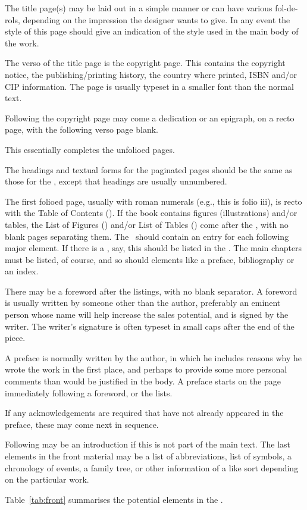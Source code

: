 \documentclass[10pt,a4paper,extrafontsizes]{memoir}
\begin{document}
\begin{paracol}{2}
    The title page(s) may be laid out in a simple manner or can have various
fol-de-rols, depending on the impression the designer wants to give. In
any event the style of this page should give an indication of the style
used in the main body of the work.

    The verso of the title page is the copyright page.
This contains the copyright notice, the publishing/printing history, 
the country where printed, ISBN and/or CIP information. The page is usually 
typeset in a smaller font than the normal text.

    Following the copyright page may come a dedication or an epigraph, 
on a recto page, with the following verso page blank.

    This essentially completes the unfolioed pages.

    The headings and textual forms for the paginated 
pages should be the same as those for the \pixmainmatter, except that 
headings are usually unnumbered.

    The first folioed page,
usually with roman numerals (e.g., this is folio iii),
is recto with the Table of Contents (\toc). If the book contains 
figures (illustrations) 
and/or tables, the List of Figures (\lof) and/or List of Tables 
(\lot) come after the \toc, with no blank pages separating them. The \toc\ 
should contain an entry for each following major element. If there is a \lot, 
say, this should be listed in the \toc. The main chapters\index{chapter} must 
be listed, of course, and so should elements like a preface\index{preface}, 
bibliography\index{bibliography} or an index\index{index}.

    There may be a foreword after the listings, with no blank
separator. A foreword is usually written by someone other than the author, 
preferably an eminent person whose name will help increase the sales potential,
and is signed by the writer. The writer's
signature is often typeset in small caps after the end of the piece.

   A preface is normally written by the author, in which he
includes reasons why he wrote the work in the first place, and perhaps to 
provide some more personal comments than would be justified in the body. 
A preface starts on the page immediately following a foreword, or the lists.

   If any acknowledgements are required that have not already appeared in the
preface, these may come next in sequence.

   Following may be an introduction if this is not part of the main text. 
The last elements in the front material may be a list of abbreviations, list
of symbols, a chronology of events, a family tree, or other information of
a like sort depending on the particular work.

    Table~\ref{tab:front} summarises the potential elements in the 
\pixfrontmatter.
\end{paracol}
\end{document}
